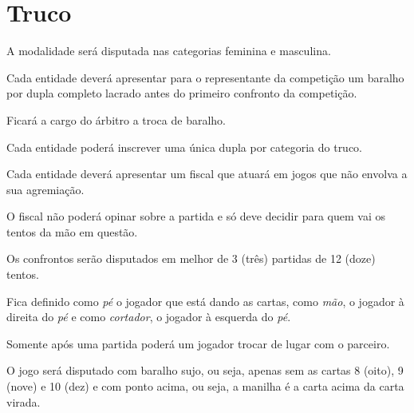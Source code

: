 {\let\clearpage\relax \chapter{Truco}}

\begin{article}
	A modalidade será disputada nas categorias feminina e masculina.
\end{article}

\begin{article}
	Cada entidade deverá apresentar para o representante da competição um baralho por dupla completo lacrado antes do primeiro confronto da competição.

	\begin{xparagraph}
		Ficará a cargo do árbitro a troca de baralho.
	\end{xparagraph}
\end{article}

\begin{article}
	Cada entidade poderá inscrever uma única dupla por categoria do truco.
\end{article}

\begin{article}
	Cada entidade deverá apresentar um fiscal que atuará em jogos que não envolva a sua agremiação.

	\begin{xparagraph}
		O fiscal não poderá opinar sobre a partida e só deve decidir para quem vai os tentos da mão em questão.
	\end{xparagraph}
\end{article}

\begin{article}
	Os confrontos serão disputados em melhor de 3 (três) partidas de 12 (doze) tentos.
\end{article}

\begin{article}
	Fica definido como \textit{pé} o jogador que está dando as cartas, como \textit{mão}, o jogador à direita do \textit{pé} e como \textit{cortador}, o jogador à esquerda do \textit{pé}.

	\begin{xparagraph}
		Somente após uma partida poderá um jogador trocar de lugar com o parceiro.
	\end{xparagraph}
\end{article}

\begin{article}
	O jogo será disputado com baralho sujo, ou seja, apenas sem as cartas 8 (oito), 9 (nove) e 10 (dez) e com ponto acima, ou seja, a manilha é a carta acima da carta virada.
\end{article}

